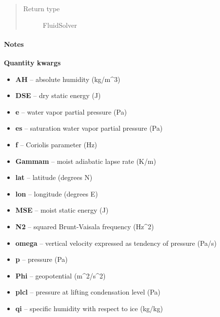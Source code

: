 \documentclass[letterpaper,10pt,english]{sphinxmanual}
\begin{document}
\begin{fulllineitems}
\begin{quote}
\begin{description}
\item[{Return type}] \leavevmode
FluidSolver

\end{description}\end{quote}
\paragraph{Notes}

\textbf{Quantity kwargs}
\begin{itemize}
\item {} 
\textbf{AH} -- absolute humidity (kg/m\textasciicircum{}3)

\item {} 
\textbf{DSE} -- dry static energy (J)

\item {} 
\textbf{e} -- water vapor partial pressure (Pa)

\item {} 
\textbf{es} -- saturation water vapor partial pressure (Pa)

\item {} 
\textbf{f} -- Coriolis parameter (Hz)

\item {} 
\textbf{Gammam} -- moist adiabatic lapse rate (K/m)

\item {} 
\textbf{lat} -- latitude (degrees N)

\item {} 
\textbf{lon} -- longitude (degrees E)

\item {} 
\textbf{MSE} -- moist static energy (J)

\item {} 
\textbf{N2} -- squared Brunt-Vaisala frequency (Hz\textasciicircum{}2)

\item {} 
\textbf{omega} -- vertical velocity expressed as tendency of pressure (Pa/s)

\item {} 
\textbf{p} -- pressure (Pa)

\item {} 
\textbf{Phi} -- geopotential (m\textasciicircum{}2/s\textasciicircum{}2)

\item {} 
\textbf{plcl} -- pressure at lifting condensation level (Pa)

\item {} 
\textbf{qi} -- specific humidity with respect to ice (kg/kg)


\end{itemize}
\end{fulllineitems}
\end{document}
